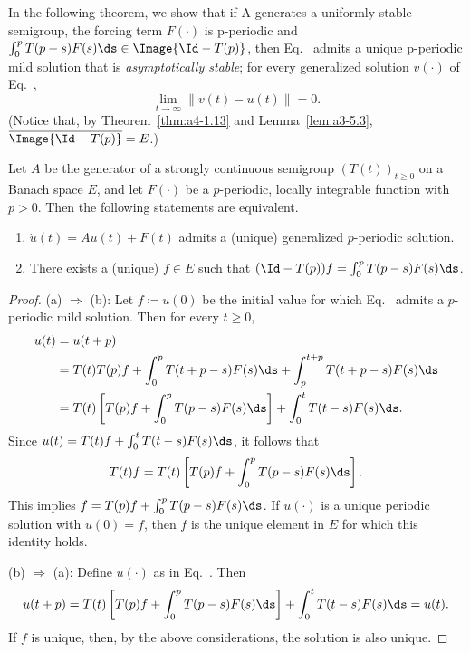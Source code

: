 In the following theorem, we show that if A generates a
uniformly stable semigroup, the forcing term $F(\cdot)$ is p-periodic
and $\int_{0}^{p} T(p-s)F(s)  \ds \in \Image{\Id - T(p)}$, then Eq.~
 admits a unique p-periodic mild solution that is \emph{asymptotically stable}; 
 \ie for every generalized solution $v(\cdot)$ of Eq.~, 
\[
\lim_{t \to \infty} \|v(t) - u(t)\| = 0.
\]  
(Notice that, by
Theorem~\ref{thm:a4-1.13} and Lemma~\ref{lem:a3-5.3}, $\overline{ \Image{ \Id - T(p) } } = E $.)
\begin{lemma}\label{lem:a4-2.2}
Let $A$ be the generator of a strongly continuous semigroup $(T(t))_{t \geq 0}$ on a Banach space $E$, and let $F(\cdot)$ be a $p$-periodic, locally integrable function with $p > 0$. 
Then the following statements are equivalent.
\begin{enumerate}[\upshape (a)]
\item 
$\dot{u}(t) = Au(t) + F(t)$ admits a (unique) generalized $p$-periodic solution.

\item 
There exists a (unique) $f \in E$ such that $(\Id - T(p))f = \int_{0}^{p} T(p-s)F(s)  \ds$.
\end{enumerate}
\end{lemma}
\begin{proof}
(a) $\Rightarrow$ (b): 
Let $f \coloneqq u(0)$ be the initial value for which Eq.~ admits a $p$-periodic mild solution. 
Then for every $t\ge 0$,
\begin{align*}
u(t) &= u(t+p) \\
&= T(t)T(p)f + \int_{0}^{p} T(t+p-s)F(s)  \ds + \int_{p}^{t+p} T(t+p-s)F(s)  \ds \\
&= T(t)\left[T(p)f + \int_{0}^{p} T(p-s)F(s)  \ds\right] + \int_{0}^{t} T(t-s)F(s)  \ds.
\end{align*}
Since $u(t) = T(t)f+\int_0^t T(t-s)F(s)\ds$, it follows that
\[T(t)f = T(t)\left[T(p)f+\int_0^pT(p-s)F(s)\ds\right].\]
This implies $f = T(p)f + \int_{0}^{p} T(p-s)F(s)  \ds$.
If\/ $u(\cdot)$ is a unique periodic solution with $u(0) = f$, then $f$ is the unique element in $E$ for which this identity holds.

(b) $\Rightarrow$ (a):  
Define $u(\cdot)$ as in Eq.~. 
Then
\begin{align*}
u(t+p) = T(t)\left[T(p)f + \int_{0}^{p} T(p-s)F(s)  \ds\right] + \int_{0}^{t} T(t-s)F(s)  \ds = u(t).
\end{align*}
If\/ $f$ is unique, then, by the above considerations, the solution is also unique.
\end{proof}

